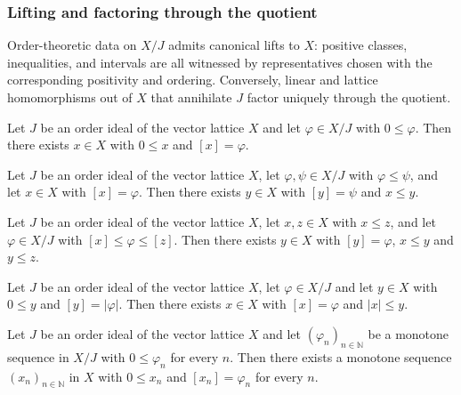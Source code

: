 \subsubsection{Lifting and factoring through the quotient}

Order-theoretic data on $X / J$ admits canonical lifts to $X$:
positive classes, inequalities, and intervals are all witnessed by
representatives chosen with the corresponding positivity and
ordering. Conversely, linear and lattice homomorphisms out of $X$
that annihilate $J$ factor uniquely through the quotient.

\begin{lemma}
\label{lem:orderIdeal-lift-pos}
\leanok
{}
Let $J$ be an order ideal of the vector lattice $X$ and let
$\varphi \in X / J$ with $0 \le \varphi$. Then there exists
$x \in X$ with $0 \le x$ and $[x] = \varphi$.
\end{lemma}

\begin{lemma}
\label{lem:orderIdeal-lift-le}
\leanok
{}
Let $J$ be an order ideal of the vector lattice $X$, let
$\varphi, \psi \in X / J$ with $\varphi \le \psi$, and let
$x \in X$ with $[x] = \varphi$. Then there exists $y \in X$ with
$[y] = \psi$ and $x \le y$.
\end{lemma}

\begin{lemma}
\label{lem:orderIdeal-lift-between}
\leanok
{}
Let $J$ be an order ideal of the vector lattice $X$, let
$x, z \in X$ with $x \le z$, and let $\varphi \in X / J$ with
$[x] \le \varphi \le [z]$. Then there exists $y \in X$ with
$[y] = \varphi$, $x \le y$ and $y \le z$.
\end{lemma}

\begin{lemma}
\label{lem:orderIdeal-lift-abs-le}
\leanok
{}
Let $J$ be an order ideal of the vector lattice $X$, let
$\varphi \in X / J$ and let $y \in X$ with $0 \le y$ and
$[y] = \lvert \varphi \rvert$. Then there exists $x \in X$ with
$[x] = \varphi$ and $\lvert x \rvert \le y$.
\end{lemma}

\begin{lemma}
\label{lem:orderIdeal-lift-increasing-seq}
\leanok
{}
Let $J$ be an order ideal of the vector lattice $X$ and let
$(\varphi_n)_{n \in \mathbb{N}}$ be a monotone sequence in $X / J$
with $0 \le \varphi_n$ for every $n$. Then there exists a monotone
sequence $(x_n)_{n \in \mathbb{N}}$ in $X$ with $0 \le x_n$ and
$[x_n] = \varphi_n$ for every $n$.
\end{lemma}

